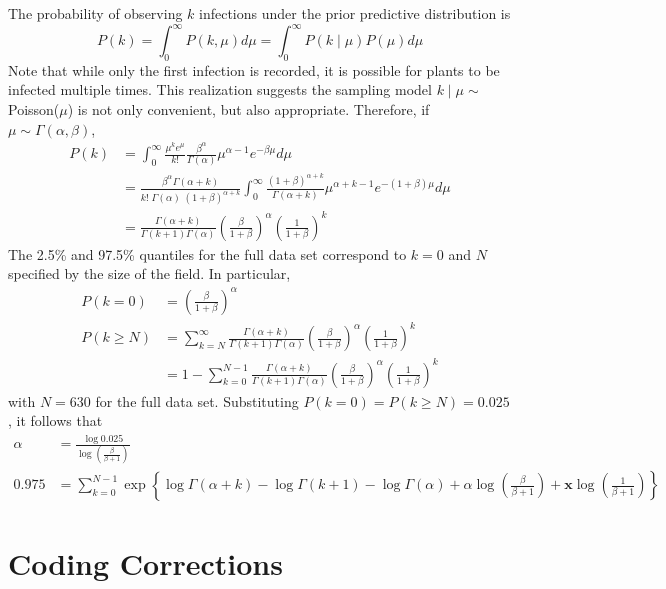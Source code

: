 \documentclass{uwstat572}
\begin{document}
The probability of observing $k$ infections under the prior predictive distribution is
$$ P(k) = \int_0^{\infty} P(k, \mu) d\mu = \int_0^{\infty} P(k \mid \mu)  P(\mu) d\mu $$
Note that while only the first infection is recorded, it is possible for plants to be infected multiple times. 
This realization suggests the sampling model $k \mid \mu \sim$ Poisson($\mu$) is not only convenient, but also appropriate. 
Therefore, if $\mu \sim \Gamma(\alpha, \beta)$,
\begin{align*}
P(k) &= \int_0^{\infty} \frac{\mu^k e^{\mu}}{k!}  \frac{\beta^{\alpha}}{\Gamma(\alpha)} \mu^{\alpha - 1} e^{-\beta \mu}d\mu \\
	&= \frac{\beta^{\alpha} \Gamma(\alpha+k)}{k! \; \Gamma(\alpha) \; (1+\beta)^{\alpha+k}}  \int_0^{\infty} \frac{(1+\beta)^{\alpha+k}}{\Gamma(\alpha+k)} \mu^{\alpha + k - 1} e^{-(1+\beta)\mu}d\mu \\
	&= \frac{\Gamma(\alpha+k)}{\Gamma(k+1) \Gamma(\alpha)} \left( \frac{\beta}{1+\beta} \right)^{\alpha} \left( \frac{1}{1+\beta} \right)^k
\end{align*}
The 2.5\% and 97.5\% quantiles for the full data set correspond to $k=0$ and $N$ specified by the size of the field. In particular, 
\begin{align*}
P(k=0) &= \left( \frac{\beta}{1+\beta} \right)^{\alpha} \\
P(k \ge N) &= \sum_{k=N}^{\infty} \frac{\Gamma(\alpha+k)}{\Gamma(k+1) \Gamma(\alpha)} \left( \frac{\beta}{1+\beta} \right)^{\alpha} \left( \frac{1}{1+\beta} \right)^k \\
	&=1 - \sum_{k=0}^{N-1} \frac{\Gamma(\alpha+k)}{\Gamma(k+1) \Gamma(\alpha)} \left( \frac{\beta}{1+\beta} \right)^{\alpha} \left( \frac{1}{1+\beta} \right)^k 
\end{align*}
with $N=630$ for the full data set. 
Substituting $P(k=0)=P(k \ge N)=0.025$, it follows that 
\begin{align*}
\alpha &= \frac{\log 0.025}{\log \left( \frac{\beta}{\beta+1} \right)} \\
0.975 &= \sum_{k=0}^{N-1} \exp \left\{ \log \Gamma(\alpha+k) - \log \Gamma(k+1) - \log \Gamma(\alpha) + \alpha \log \left(\frac{\beta}{\beta +1} \right) + \boldsymbol{x} \log \left(\frac{1}{\beta +1} \right) \right\}
\end{align*}

\newpage

\section{Coding Corrections}
\label{coding_corrections}
\end{document}
